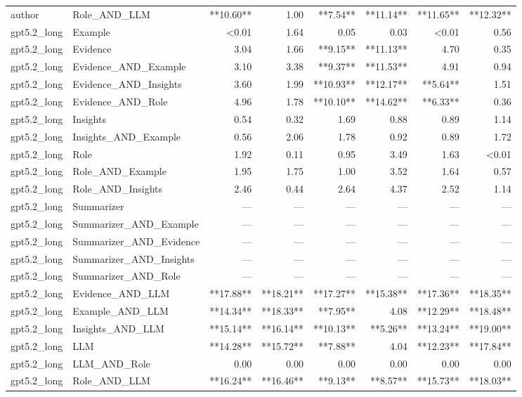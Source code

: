\begin{tabular}{llrrrrrr}
author & Role_AND_LLM & **10.60** & 1.00 & **7.54** & **11.14** & **11.65** & **12.32** \\
gpt5.2_long & Example & <0.01 & 1.64 & 0.05 & 0.03 & <0.01 & 0.56 \\
gpt5.2_long & Evidence & 3.04 & 1.66 & **9.15** & **11.13** & 4.70 & 0.35 \\
gpt5.2_long & Evidence_AND_Example & 3.10 & 3.38 & **9.37** & **11.53** & 4.91 & 0.94 \\
gpt5.2_long & Evidence_AND_Insights & 3.60 & 1.99 & **10.93** & **12.17** & **5.64** & 1.51 \\
gpt5.2_long & Evidence_AND_Role & 4.96 & 1.78 & **10.10** & **14.62** & **6.33** & 0.36 \\
gpt5.2_long & Insights & 0.54 & 0.32 & 1.69 & 0.88 & 0.89 & 1.14 \\
gpt5.2_long & Insights_AND_Example & 0.56 & 2.06 & 1.78 & 0.92 & 0.89 & 1.72 \\
gpt5.2_long & Role & 1.92 & 0.11 & 0.95 & 3.49 & 1.63 & <0.01 \\
gpt5.2_long & Role_AND_Example & 1.95 & 1.75 & 1.00 & 3.52 & 1.64 & 0.57 \\
gpt5.2_long & Role_AND_Insights & 2.46 & 0.44 & 2.64 & 4.37 & 2.52 & 1.14 \\
gpt5.2_long & Summarizer & — & — & — & — & — & — \\
gpt5.2_long & Summarizer_AND_Example & — & — & — & — & — & — \\
gpt5.2_long & Summarizer_AND_Evidence & — & — & — & — & — & — \\
gpt5.2_long & Summarizer_AND_Insights & — & — & — & — & — & — \\
gpt5.2_long & Summarizer_AND_Role & — & — & — & — & — & — \\
gpt5.2_long & Evidence_AND_LLM & **17.88** & **18.21** & **17.27** & **15.38** & **17.36** & **18.35** \\
gpt5.2_long & Example_AND_LLM & **14.34** & **18.33** & **7.95** & 4.08 & **12.29** & **18.48** \\
gpt5.2_long & Insights_AND_LLM & **15.14** & **16.14** & **10.13** & **5.26** & **13.24** & **19.00** \\
gpt5.2_long & LLM & **14.28** & **15.72** & **7.88** & 4.04 & **12.23** & **17.84** \\
gpt5.2_long & LLM_AND_Role & 0.00 & 0.00 & 0.00 & 0.00 & 0.00 & 0.00 \\
gpt5.2_long & Role_AND_LLM & **16.24** & **16.46** & **9.13** & **8.57** & **15.73** & **18.03** \\

\end{tabular}
